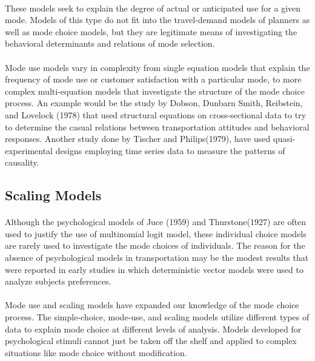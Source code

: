 \paragraph{}These models seek to explain the degree of actual or anticipated use for a given mode. Models of this type do not fit into the travel-demand models of planners as well as mode choice models, but they are legitimate means of investigating the behavioral determinants and relations of mode selection.
\paragraph{}Mode use models vary in complexity from single equation models that explain the frequency of mode use or customer satisfaction with a particular mode, to more complex multi-equation models that investigate the structure of the mode choice process. An example would be the study by Dobson, Dunbarn Smith, Reibstein, and Lovelock (1978) that used structural equations on cross-sectional data to try to determine the casual relations between transportation attitudes and behavioral responses. Another study done by Tischer and Philips(1979), have used quasi-experimental designs employing time series data to measure the patterns of causality.

\subsection{Scaling Models}
\paragraph{}Although the psychological models of Juce (1959) and Thurstone(1927) are often used to justify the use of multinomial logit model, these individual choice models are rarely used to investigate the mode choices of individuals.  The reason for the absence of psychological models in transportation may be the modest results that were reported in early studies in which deterministic vector models were used to analyze subjects preferences.
\paragraph{}Mode use and scaling models have expanded our knowledge of the mode choice process. The simple-choice, mode-use, and scaling models utilize different types of data to explain mode choice at different levels of analysis. Models developed for psychological stimuli cannot just be taken off the shelf and applied to complex situations like mode choice without modification.


